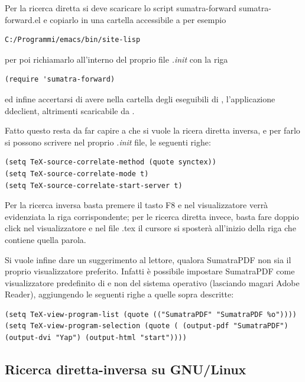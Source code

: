 \documentclass[11pt,a4paper]{article}
\begin{document}
Per la ricerca diretta si deve scaricare lo script
sumatra-forward %
{sumatra-forward.el} %
e copiarlo in una cartella accessibile a \emacs{} per esempio
\begin{Verbatim}
C:/Programmi/emacs/bin/site-lisp
\end{Verbatim}
 per poi richiamarlo all'interno del proprio file \emph{.init} con la riga
\begin{Verbatim}
(require 'sumatra-forward)
\end{Verbatim}
ed infine accertarsi di avere nella cartella degli eseguibili di
\emacs, l'applicazione \textsf{ddeclient}, altrimenti scaricabile da
.

Fatto questo resta da far capire a \emacs{} che si vuole la ricera
diretta inversa, e per farlo si possono scrivere nel proprio
\emph{.init} file, le seguenti righe:
\begin{Verbatim}
(setq TeX-source-correlate-method (quote synctex))
(setq TeX-source-correlate-mode t)
(setq TeX-source-correlate-start-server t)
\end{Verbatim}

Per la ricerca inversa basta premere il tasto \textsf{F8} e nel
visualizzatore verrà evidenziata la riga corrispondente; per le
ricerca diretta invece, basta fare doppio click nel visualizzatore e
nel file .tex il cursore si sposterà all'inizio della riga che
contiene quella parola.

Si vuole infine dare un suggerimento al lettore, qualora
\textsf{SumatraPDF} non sia il proprio visualizzatore
preferito. Infatti è possibile impostare \textsf{SumatraPDF} come
visualizzatore predefinito di \emacs{} e non del sistema operativo
(lasciando magari \textsf{Adobe Reader}), aggiungendo le seguenti
righe a quelle sopra descritte:
\begin{Verbatim}
(setq TeX-view-program-list (quote (("SumatraPDF" "SumatraPDF %o"))))
(setq TeX-view-program-selection (quote ( (output-pdf "SumatraPDF")
(output-dvi "Yap") (output-html "start"))))
\end{Verbatim}

\subsection{Ricerca diretta-inversa su GNU/Linux}
\label{sec:fislinux}

\textcolor{red}{\lipsum[1]}
\end{document}
